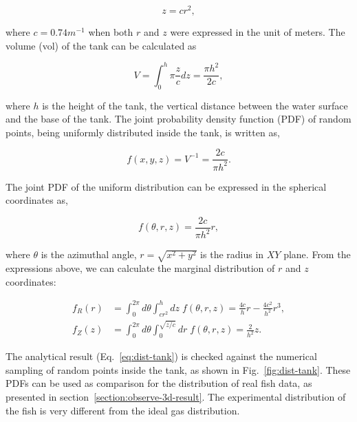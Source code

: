 \documentclass[11pt,twoside]{report}
\begin{document}
\begin{equation*}
	z = c r^2,	
\end{equation*}


\noindent where $c=0.74 m^{-1}$ when both $r$ and $z$ were expressed in the unit of meters. The volume (\gls{vol}) of the tank can be calculated as

\begin{equation*}
	V = \int_{0}^{h}{\pi \frac{z}{c}} dz
	  = \frac{\pi h^2}{2 c},	
\end{equation*}


\noindent where $h$ is the height of the tank, the vertical distance between the water surface and the base of the tank. The joint probability density function (PDF) of random points, being uniformly distributed inside the tank, is written as,

\begin{equation*}
	f(x, y, z) = V^{-1} = \frac{2c}{\pi h^2}.		
\end{equation*}

\noindent The joint PDF of the uniform distribution can be expressed in the spherical coordinates as,

\begin{equation}
	f(\theta, r, z) = \frac{2c}{\pi h^2} r,
\label{eq:density-pdf-tank}
\end{equation}

\noindent where $\theta$ is the azimuthal angle, $r = \sqrt{x^2 + y^2}$ is the radius in $XY$ plane.  From the expressions above, we can calculate the marginal distribution of $r$ and $z$ coordinates:

\begin{equation}
\begin{split}
	f_R(r) &= \int_0^{2\pi}{d \theta} \int_{cr^2}^{h}{dz} \; f(\theta, r, z)
		= \frac{4c}{h} r - \frac{4 c^2}{h^2} r^3, \\[2em]
	f_Z(z) &= \int_0^{2\pi}{d \theta} \int_0^{\sqrt{z/c}}{dr} \; f(\theta, r, z) 
	= \frac{2}{h^2} z.
\end{split}
\label{eq:dist-tank}
\end{equation}

\noindent The analytical result (Eq.~\ref{eq:dist-tank}) is checked against the numerical sampling of random points inside the tank, as shown in Fig.~\ref{fig:dist-tank}. These PDFs can be used as comparison for the distribution of real fish data, as presented in section~\ref{section:observe-3d-result}. The experimental distribution of the fish is very different from the ideal gas distribution.
\end{document}
